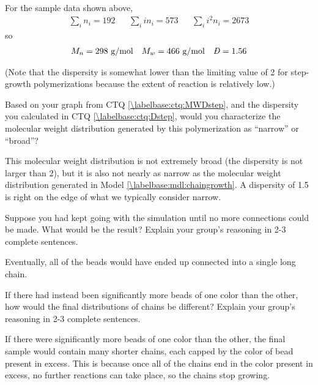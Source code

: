 \begin{activity}
\begin{ctqs}
\begin{solution}[3in]
{			For the sample data shown above,
			\begin{align*}
				\sum_i n_i = 192 && \sum_i i n_i = 573 && \sum_i i^2 n_i = 2673
			\end{align*}
			so
			\begin{align*}
				M_n = 298\text{ g/mol} && M_w = 466\text{ g/mol} && \PDImath = 1.56
			\end{align*}
			
			(Note that the dispersity is somewhat lower than the limiting value of 2 for step-growth polymerizations because the extent of reaction is relatively low.)
		}\end{solution}
	
	\question Based on your graph from CTQ \ref{\labelbase:ctq:MWDstep}, and the dispersity you calculated in CTQ \ref{\labelbase:ctq:Dstep}, would you characterize the molecular weight distribution generated by this polymerization as ``narrow'' or ``broad''?  %
	
		\begin{solution}[1in]
			This molecular weight distribution is not extremely broad (the dispersity is not larger than 2), but it is also not nearly as narrow as the molecular weight distribution generated in Model \ref{\labelbase:mdl:chaingrowth}.  A dispersity of 1.5 is right on the edge of what we typically consider narrow.
		\end{solution}
	
	\question Suppose you had kept going with the simulation until no more  connections could be made.  What would be the result?  Explain your group's reasoning in 2-3 complete sentences.
	
		\begin{solution}[1.75in]
			Eventually, all of the beads would have ended up connected into a single long chain.
		\end{solution}
	
	\question If there had instead been significantly more beads of one color than the other, how would the final distributions of chains be different?  Explain your group's reasoning in 2-3 complete sentences.
	
		\begin{solution}[1.75in]
			If there were significantly more beads of one color than the other, the final sample would contain many shorter chains, each capped by the color of bead present in excess.  This is because once all of the chains end in the color present in excess, no further reactions can take place, so the chains stop growing.
		\end{solution}
	

\end{ctqs}
\end{activity}
